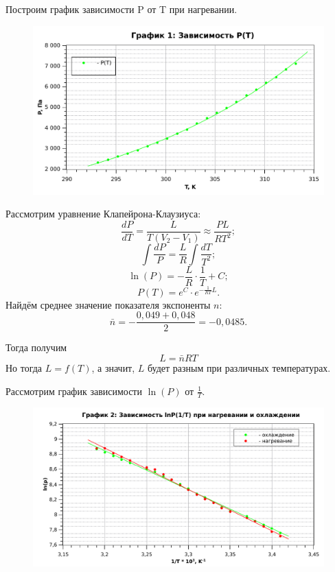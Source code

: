 \documentclass[a4paper,12pt]{article} %
\theoremstyle{plain} %
\theoremstyle{definition} %
\theoremstyle{remark} %
\begin{document}
\newpage
Построим график зависимости P от T при нагревании.

\begin{figure}[H]
    \centering
	\includegraphics[scale=0.8]{Graph1.pdf}
\end{figure} 


Рассмотрим уравнение Клапейрона-Клаузиуса:
\[\dfrac{dP}{dT}=\dfrac{L}{T(V_2-V_1)}\approx \dfrac{PL}{RT^2};\]
\[\int \dfrac{dP}{P}=\dfrac{L}{R} \int \dfrac{dT}{T^2};\]
\[\ln(P)=-\dfrac{L}{R}\cdot \dfrac{1}{T}+C;\]
\[P(T)=e^C\cdot e^{-\frac{1}{RT}L}.\]
Найдём среднее значение показателя экспоненты $n$:
\[\bar{n}=-\frac{0,049+0,048}{2}=-0,0485.\]

Тогда получим
\[L=\bar{n}RT\]
Но тогда $L=f(T)$, а значит, $L$ будет разным при различных температурах.

Рассмотрим график зависимости $\ln(P)$ от $\frac{1}{T}$.

\begin{figure}[H]
    \centering
	\includegraphics[scale=0.8]{Graph2.pdf}
\end{figure}
\end{document}
